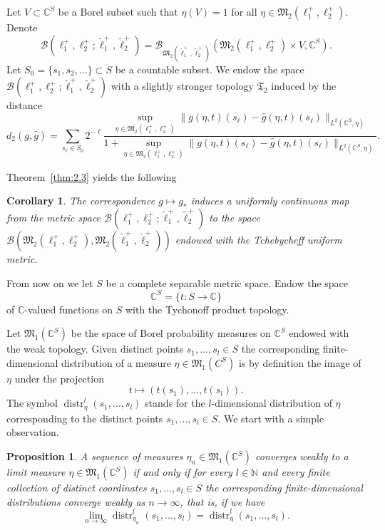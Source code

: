 \documentclass[12pt,a4paper]{article}
\newtheorem{proposition}[theorem]{Proposition}
\newtheorem{corollary}[theorem]{Corollary}
\theoremstyle{definition}
\theoremstyle{remark}
\newcommand{\BB}{\mathscr{B}}
\newcommand{\MM}{{\mathfrak{M}}}
\newcommand{\TT}{{\mathfrak{T}}}
\begin{document}
	Let $V \subset {\mathbb C}^S$ be a Borel subset such that $\eta(V) = 1$ for all $\eta \in \MM_2(\ell_1^+, \ell_2^+)$. Denote
	\[
	\BB(\ell_1^+, \ell_2^+; \widetilde{\ell}_1^+, \widetilde{\ell}_2^+) =
	\BB_{\MM_2(\widetilde{\ell}_1^+, \widetilde{\ell}_2^+)}(\MM_2(\ell_1^+, \ell_2^+) \times V, {\mathbb C}^S).
	\]
	Let $S_0 = \{s_1, s_2, \ldots\} \subset S$ be a countable subset. We endow the space $\BB(\ell_1^+, \ell_2^+; \widetilde{\ell}_1^+, \widetilde{\ell}_2^+)$
	with a slightly stronger topology $\TT_2$ induced by the distance
	\[
	d_2(g, \widehat{g}) =
	\sum_{s_\ell \in S_0}
	2^{-\ell}
	\frac{\displaystyle\sup_{\eta \in \MM_2(\ell_1^+, \ell_2^+)}
		\|g(\eta, t)(s_\ell) - \widehat{g}(\eta, t)(s_\ell)\|_{L^2(\mathbb{C}^S, \eta)}}
	{1 + \displaystyle\sup_{\eta \in \MM_2(\ell_1^+, \ell_2^+)}
		\|g(\eta, t)(s_\ell) - \widehat{g}(\eta, t)(s_\ell)\|_{L^2(\mathbb{C}^S, \eta)}}.
	\]
	
	Theorem~\ref{thm:2.3} yields the following
	\begin{corollary}
		\label{cor:4.1}
		The correspondence $g \mapsto g_*$ induces a uniformly continuous map from the metric space
		$\BB(\ell_1^+, \ell_2^+; \widetilde{\ell}_1^+, \widetilde{\ell}_2^+)$ to the space $\BB(\MM_2(\ell_1^+, \ell_2^+), \MM_2(\widetilde{\ell}_1^+, \widetilde{\ell}_2^+))$ endowed with the Tchebycheff uniform metric.
	\end{corollary}
	
	From now on we let $S$ be a complete separable metric space. Endow the space
	\[
	{\mathbb C}^S = \{ t : S \to \mathbb{C} \}
	\]
	of $\mathbb{C}$-valued functions on $S$ with the Tychonoff product topology.
	
	Let $\MM_1(\mathbb{C}^S)$ be the space of Borel probability measures on 
	$\mathbb{C}^S$ endowed with the weak topology.
	Given distinct points $s_1, \ldots, s_l \in S$ the corresponding finite-dimensional distribution of a measure $\eta \in \MM_1(C^S)$ is by definition the image of $\eta$ under the projection
	\[
	t \mapsto (t(s_1), \ldots, t(s_l)).
	\]
	The symbol $\operatorname{distr}^l_\eta(s_1, \ldots, s_l)$ stands for the $l$-dimensional distribution
	of $\eta$ corresponding to the distinct points $s_1, \ldots, s_l \in S$.
	We start with a simple observation.
	
	\begin{proposition}
		\label{prop:4.2}
		A sequence of measures $\eta_n \in \MM_1(\mathbb{C}^S)$ converges weakly to a limit measure $\eta \in \MM_1(\mathbb{C}^S)$ if and only if
		for every $l \in \mathbb{N}$ and every finite collection of distinct coordinates $s_1, \ldots, s_l \in S$ the corresponding
		finite-dimensional distributions converge weakly as $n \to \infty$, that is, if we have 
		\[
		\lim\limits_{n\to\infty}\operatorname{distr}^l_{\eta_n}(s_1, \ldots, s_l)= \operatorname{distr}^l_{\eta}(s_1, \ldots, s_l).
		\]
	\end{proposition}
	
\end{document}

